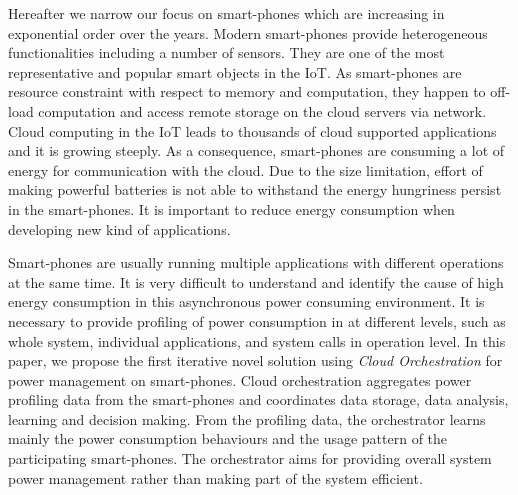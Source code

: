 Hereafter we narrow our focus on smart-phones which are increasing in exponential order over the years. Modern smart-phones provide heterogeneous functionalities including a number of sensors. They are one of the most representative and popular smart objects in the IoT. As smart-phones are resource constraint with respect to memory and computation, they happen to off-load computation and access remote storage on the cloud servers via network. Cloud computing in the IoT leads to thousands of cloud supported applications and it is growing steeply. As a consequence, smart-phones are consuming a lot of energy for communication with the cloud. Due to the size limitation, effort of making powerful batteries is not able to withstand the energy hungriness persist in the smart-phones. It is important to reduce energy consumption when developing new kind of applications.

Smart-phones are usually running multiple applications with different operations at the same time. It is very difficult to understand and identify the cause of high energy consumption in this asynchronous power consuming environment. It is necessary to provide profiling of power consumption in at different levels, such as whole system, individual applications, and system calls in operation level. In this paper, we propose the first iterative novel solution using \textit{Cloud Orchestration} for power management on smart-phones. Cloud orchestration aggregates power profiling data from the smart-phones and coordinates data storage, data analysis, learning and decision making. From the profiling data, the orchestrator learns mainly the power consumption behaviours and the usage pattern of the participating smart-phones. The orchestrator aims for providing overall system power management rather than making part of the system efficient. 


